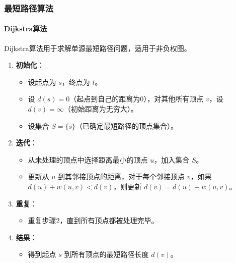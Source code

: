 \documentclass[UTF8]{ctexart}
\begin{document}
\subsubsection {最短路径算法}
\paragraph{Dijkstra算法}
Dijkstra算法用于求解单源最短路径问题，适用于非负权图。
\begin{enumerate}
    \item \textbf{初始化}：
        \begin{itemize}
            \item 设起点为 \( s \)，终点为 \( t \)。
            \item 设 \( d(s) = 0 \)（起点到自己的距离为0），对其他所有顶点 \( v \)，设 \( d(v) = \infty \)（初始距离为无穷大）。
            \item 设集合 \( S = \{s\} \)（已确定最短路径的顶点集合）。
        \end{itemize}
    \item \textbf{迭代}：
        \begin{itemize}
            \item 从未处理的顶点中选择距离最小的顶点 \( u \)，加入集合 \( S \)。
            \item 更新从 \( u \) 到其邻接顶点的距离，对于每个邻接顶点 \( v \)，如果 \( d(u) + w(u, v) < d(v) \)，则更新 \( d(v) = d(u) + w(u, v) \)。
        \end{itemize}
    \item \textbf{重复}：
        \begin{itemize}
            \item 重复步骤2，直到所有顶点都被处理完毕。
        \end{itemize}
    \item \textbf{结果}：
        \begin{itemize}
            \item 得到起点 \( s \) 到所有顶点的最短路径长度 \( d(v) \)。
        \end{itemize}
\end{enumerate}
\end{document}
